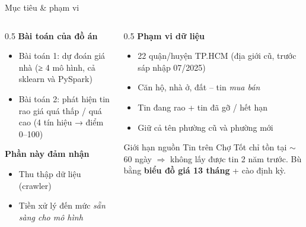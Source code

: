 \documentclass[aspectratio=169,11pt]{beamer}
\newcommand{\ghichu}[1]{{\color{muted}\footnotesize #1}}
\begin{document}
\begin{frame}{Mục tiêu \& phạm vi}
  \begin{columns}[T]
    \begin{column}{0.5\linewidth}
      \textbf{Bài toán của đồ án}
      \begin{itemize}
        \item Bài toán 1: dự đoán giá nhà (≥ 4 mô hình, cả sklearn và PySpark)
        \item Bài toán 2: phát hiện tin rao giá quá thấp / quá cao (4 tín hiệu → điểm 0--100)
      \end{itemize}
      \vspace{0.8em}
      \textbf{Phần này đảm nhận}
      \begin{itemize}
        \item Thu thập dữ liệu (crawler)
        \item Tiền xử lý đến mức \emph{sẵn sàng cho mô hình}
      \end{itemize}
    \end{column}
    \begin{column}{0.5\linewidth}
      \textbf{Phạm vi dữ liệu}
      \begin{itemize}
        \item 22 quận/huyện TP.HCM \ghichu{(địa giới cũ, trước sáp nhập 07/2025)}
        \item Căn hộ, nhà ở, đất -- tin \emph{mua bán}
        \item Tin đang rao + tin đã gỡ / hết hạn
        \item Giữ cả tên phường cũ và phường mới
      \end{itemize}
      \vspace{0.8em}
      \begin{block}{Giới hạn nguồn}
        Tin trên Chợ Tốt chỉ tồn tại $\sim$60 ngày $\Rightarrow$ không lấy được tin 2 năm trước.
        Bù bằng \textbf{biểu đồ giá 13 tháng} + cào định kỳ.
      \end{block}
    \end{column}
  \end{columns}
\end{frame}
\end{document}
